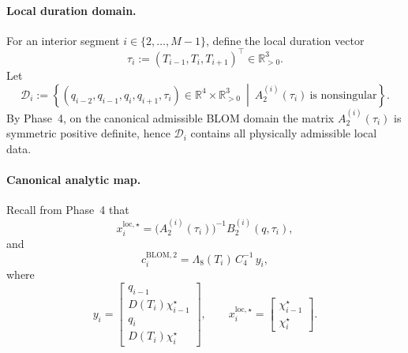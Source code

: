 \paragraph{Local duration domain.}
For an interior segment \(i\in\{2,\dots,M-1\}\), define the local duration vector
\[
\tau_i:=(T_{i-1},T_i,T_{i+1})^\top\in\mathbb R_{>0}^3.
\]
Let
\begin{equation}
\label{eq:phase6_domain}
\mathcal D_i
:=
\left\{
(q_{i-2},q_{i-1},q_i,q_{i+1},\tau_i)
\in \mathbb R^4\times \mathbb R_{>0}^3
\ \middle|\
A_2^{(i)}(\tau_i)\ \text{is nonsingular}
\right\}.
\end{equation}
By Phase~4, on the canonical admissible BLOM domain the matrix \(A_2^{(i)}(\tau_i)\) is symmetric positive definite, hence \(\mathcal D_i\) contains all physically admissible local data.

\paragraph{Canonical analytic map.}
Recall from Phase~4 that
\begin{equation}
\label{eq:phase6_x_def}
x_i^{\mathrm{loc},\star}
=
\bigl(A_2^{(i)}(\tau_i)\bigr)^{-1} B_2^{(i)}(q,\tau_i),
\end{equation}
and
\begin{equation}
\label{eq:phase6_ci_def}
c_i^{\mathrm{BLOM},2}
=
\Lambda_8(T_i)\,C_4^{-1}\,y_i,
\end{equation}
where
\begin{equation}
\label{eq:phase6_y_def}
y_i
=
\begin{bmatrix}
q_{i-1}\\
D(T_i)\chi_{i-1}^\star\\
q_i\\
D(T_i)\chi_i^\star
\end{bmatrix},
\qquad
x_i^{\mathrm{loc},\star}
=
\begin{bmatrix}
\chi_{i-1}^\star\\
\chi_i^\star
\end{bmatrix}.
\end{equation}

